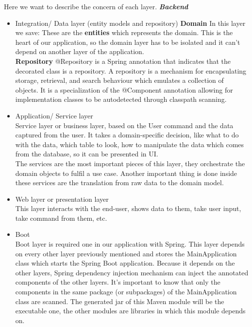 \documentclass{scrartcl}
\begin{document}
Here we want to describe the concern of each layer.
\textbf{\textit{Backend }}


\begin{itemize}
\item Integration/ Data layer (entity models and repository)
\textbf{Domain}
In this layer we save:
These are the \textbf{entities} which represents the domain. This is the heart of our application, so the domain layer has to be isolated and it can't depend on another layer of the application.\\
\textbf{Repository}
@Repository is a Spring annotation that indicates that the decorated class is a repository. A repository is a mechanism for encapsulating storage, retrieval, and search behaviour which emulates a collection of objects. It is a specialization of the @Component annotation allowing for implementation classes to be autodetected through classpath scanning.	
	
\item	Application/ Service layer \\
Service layer or business layer, based on the User command and the data captured from the user. It takes a domain-specific decision, like what to do with the data, which table to look, how to manipulate the data which comes from the database, so it can be presented in UI.\\
The services are the most important pieces of this layer, they orchestrate the domain objects to fulfil a use case. Another important thing is done inside these services are the translation from raw data to the domain model.\\
\item  Web layer or presentation layer\\
This layer interacts with the end-user, shows data to them, take user input, take command from them, etc.

\item Boot \\
Boot layer is required one in our application with Spring. This layer depends on every other layer previously mentioned and stores the MainApplication class which starts the Spring Boot application. Because it depends on the other layers, Spring dependency injection mechanism can inject the annotated components of the other layers. It’s important to know that only the components in the same package (or subpackages) of the MainApplication class are scanned. The generated jar of this Maven module will be the executable one, the other modules are libraries in which this module depends on.\\


\end{itemize}
\end{document}
